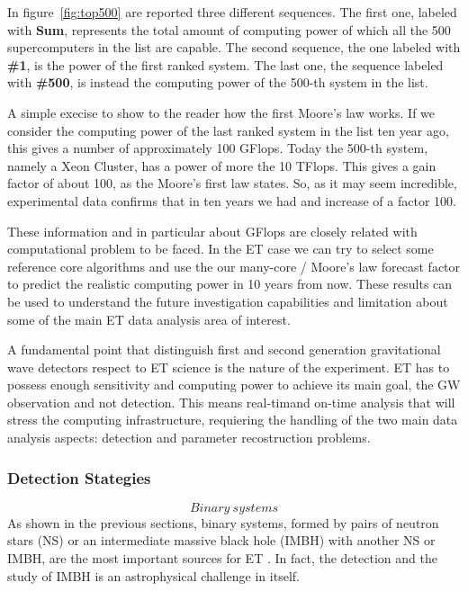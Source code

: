 In figure~\ref{fig:top500} are reported three different sequences.
The first one, labeled with {\bf Sum}, represents 
the total amount of computing power of which all the 500 supercomputers in the list are capable. The second sequence, 
the one labeled with {\bf \#1}, is the power of the first ranked system. The last one, the sequence labeled 
with {\bf \#500}, is instead the computing power of the 500-th system in the list. 

A simple execise to show to the reader how the first Moore's law works. If we consider the computing power of the last ranked system
in the list ten year ago, this gives a number of approximately 100 GFlops. Today the 500-th system, namely a Xeon 
Cluster, has a power of more the 10 TFlops. This gives a gain factor of about 100, as the Moore's first law states. So, as it may seem incredible, 
experimental data confirms that in ten years we had and increase of a factor 100.   



These information and in particular about GFlops are closely related with computational problem to be faced. In the ET case we can try to select some reference core algorithms and use the our  many-core / Moore's law forecast factor to predict the realistic computing power in 10 years from now. These results can be used to understand the future investigation capabilities and limitation  about some of the main ET data analysis area of interest. 

A fundamental point that distinguish first and second generation gravitational wave detectors  respect to ET science is the nature of the experiment. ET has to possess enough sensitivity and computing power to achieve its main goal, the GW observation and not detection. This means real-timand on-time analysis that will stress the computing infrastructure, requiering the handling of the two main data analysis aspects: detection and parameter recostruction problems.

\FloatBarrier
\subsubsection{Detection Stategies}

{\bf \[Binary~systems\]}  
As shown in the previous sections, binary systems, formed by pairs of neutron stars (NS) or an intermediate massive black hole (IMBH) with another NS or IMBH, are the most important sources for ET \cite{Sathyaprakash2009}. In fact, the detection and the study of IMBH is an astrophysical challenge in itself. 



